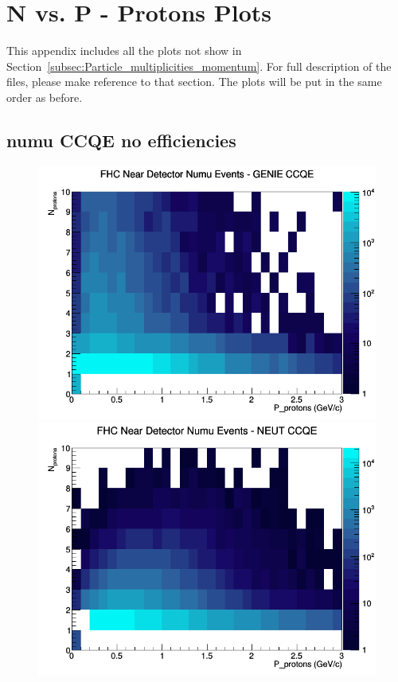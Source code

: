 \section{N vs. P - Protons Plots}
\label{app:Q2_app}
This appendix includes all the plots not show in Section~\ref{subsec:Particle_multiplicities_momentum}. For full description of the files, please make reference to that section. The plots will be put in the same order as before.
\subsection{numu CCQE no efficiencies}
\begin{figure}[h]
\includegraphics[width=\linewidth]{N_P/nominal/protons/CCQE_FHC_ND_numu_N_P_GENIE.png}
\endminipage
{}
\includegraphics[width=\linewidth]{N_P/nominal/protons/CCQE_FHC_ND_numu_N_P_NEUT.png}

\end{figure}
